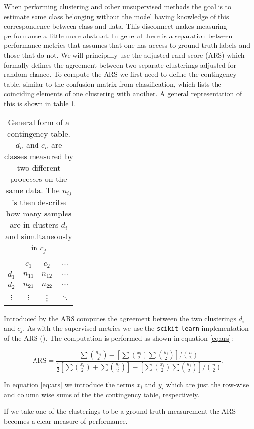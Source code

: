 When performing clustering and other unsupervised methods the goal is to estimate some class belonging without the model having knowledge of this correspondence between class and data. This disconnect makes measuring performance a little more abstract. In general there is a separation between performance metrics that assumes that one has access to ground-truth labels and those that do not. We will principally use the adjusted rand score (ARS) which formally defines the agreement between two separate clusterings adjusted for random chance. To compute the ARS we first need to define the contingency table, similar to the confusion matrix from classification, which lists the coinciding elements of one clustering with another. A general representation of this is shown in table \ref{tab:contingency}. 

\begin{table}
\centering
\caption{General form of a contingency table. $d_n$ and $c_n$ are classes measured by two different processes on the same data. The $n_{ij}$'s then describe how many samples are in clusters $d_i$ and simultaneously in $c_j$}\label{tab:contingency}
\begin{tabular}{c|ccc}
& $c_1$ &$c_2$ & $\cdots$\\
\midrule
$d_1$ & $n_{11}$ & $n_{12}$ &  $\cdots$ \\
$d_2$ & $n_{21}$ & $n_{22}$ &  $\cdots$ \\
$\vdots$ & $\vdots$ & \vdots & $\ddots$ \\
\end{tabular}
\end{table}

Introduced by \cite{Hubert1985} the ARS computes the agreement between the two clusterings $d_i$ and $c_j$. As with the supervised metrics we use the \lstinline{scikit-learn} implementation of the ARS (\cite{Pedregosa2011}). The computation is performed as shown in equation \ref{eq:ars}:

\begin{equation}\label{eq:ars}
\text{ARS} = \frac{\sum  \binom{n_{ij}}{2} - \left[\sum  \binom{x_{i}}{2} \sum  \binom{y_{j}}{2}  \right]/\binom{n}{2}}{\frac{1}{2}\left[\sum  \binom{x_{i}}{2} + \sum  \binom{y_{j}}{2}  \right]- \left[\sum  \binom{x_{i}}{2} \sum  \binom{y_{j}}{2}  \right]/\binom{n}{2}}.
\end{equation}

\noindent In equation \ref{eq:ars} we introduce the terms $x_i$ and $y_i$ which are just the row-wise and column wise sums of the the contingency table, respectively.

If we take one of the clusterings to be a ground-truth measurement the ARS becomes a clear measure of performance. 